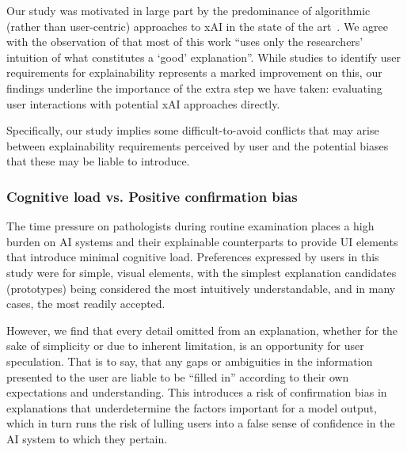 Our study was motivated in large part by the predominance of algorithmic (rather than user-centric) approaches to xAI in the state of the art~\cite{tjoa_survey_2020, poceviciute_survey_2020, antoniadi2021current}. We agree with the observation of \citet{miller2019explanation} that most of this work ``uses only the researchers' intuition of what constitutes a ‘good’ explanation''. While studies to identify user requirements for explainability represents a marked improvement on this, our findings underline the importance of the extra step we have taken: evaluating user interactions with potential xAI approaches directly.

Specifically, our study implies some difficult-to-avoid conflicts that may arise between explainability requirements perceived by user and the potential biases that these may be liable to introduce.

\subsubsection{Cognitive load vs. Positive confirmation bias}

The time pressure on pathologists during routine examination places a high burden on AI systems and their explainable counterparts to provide UI elements that introduce minimal cognitive load. Preferences expressed by users in this study were for simple, visual elements, with the simplest explanation candidates (prototypes) being considered the most intuitively understandable, and in many cases, the most readily accepted.

However, we find that every detail omitted from an explanation, whether for the sake of simplicity or due to inherent limitation, is an opportunity for user speculation. That is to say, that any gaps or ambiguities in the information presented to the user are liable to be ``filled in'' according to their own expectations and understanding. This introduces a risk of confirmation bias in explanations that underdetermine the factors important for a model output, which in turn runs the risk of lulling users into a false sense of confidence in the AI system to which they pertain.


